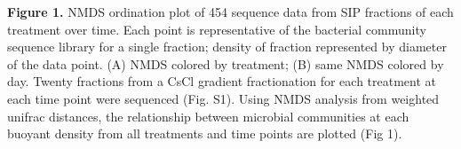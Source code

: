 \textbf{Figure 1.} NMDS ordination plot of 454 sequence data from SIP fractions of each treatment over time. Each point is representative of the bacterial community sequence library for a single fraction; density of fraction represented by diameter of the data point. (A) NMDS colored by treatment; (B) same NMDS colored by day.
Twenty fractions from a CsCl gradient fractionation for each treatment at each time point were sequenced (Fig. S1). Using NMDS analysis from weighted unifrac distances, the relationship between microbial communities at each buoyant density from all treatments and time points are plotted (Fig 1).